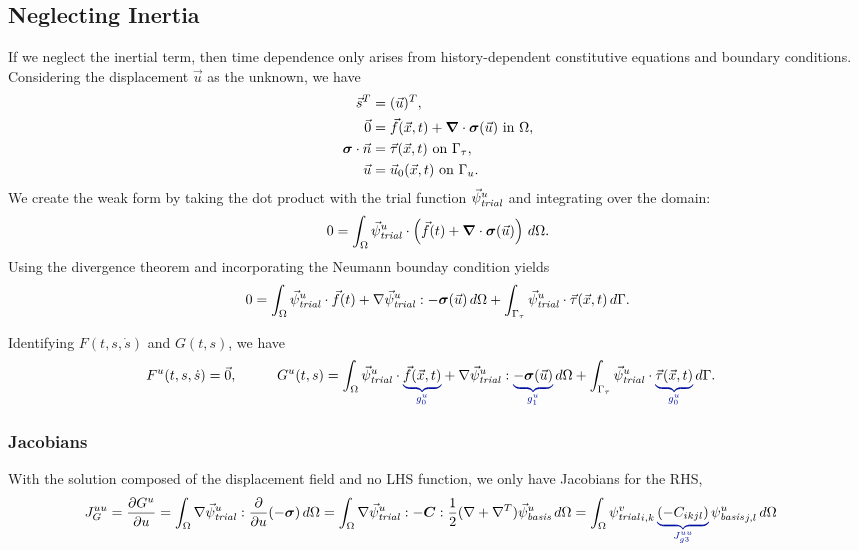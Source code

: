 \subsection{Neglecting Inertia}

If we neglect the inertial term, then time dependence only arises
from history-dependent constitutive equations and boundary
conditions. Considering the displacement $\vec{u}$ as the unknown, we
have
\begin{align}
  \vec{s}^T &= (\vec{u})^T, \\
%
  \vec{0} &= \vec{f}(\vec{x},t) + \tensor{\nabla} \cdot \tensor{\sigma}(\vec{u}) \text{ in }
\Omega, \\
  \tensor{\sigma} \cdot \vec{n} &= \vec{\tau}(\vec{x},t) \text{ on }\Gamma_\tau, \\
  \vec{u} &= \vec{u}_0(\vec{x},t) \text{ on }\Gamma_u.
\end{align}
We create the weak form by taking the dot product with the trial
function $\trialvec[u]$ and integrating over the domain:
\begin{equation}
  0 = \int_\Omega \trialvec[u] \cdot \left( \vec{f}(t) + \tensor{\nabla} \cdot \tensor{\sigma}
(\vec{u})  \right) 
\, d\Omega.
\end{equation}
Using the divergence theorem and incorporating the Neumann bounday
condition yields
\begin{equation}
  0 = \int_\Omega \trialvec[u] \cdot \vec{f}(t) + \nabla \trialvec[u] : -\tensor{\sigma}
(\vec{u}) \, d\Omega + 
\int_{\Gamma_\tau} \trialvec[u] \cdot \vec{\tau}(\vec{x},t) \, d\Gamma.
\end{equation}

Identifying $F(t,s,\dot{s})$ and $G(t,s)$, we have
\begin{alignat}{2}
  F^u(t,s,\dot{s}) &= \vec{0},
  & \qquad
  G^u(t,s) &= \int_\Omega \trialvec[u] \cdot \eqnannotate{\vec{f}(\vec{x},t)}{g_0^u} + \nabla 
\trialvec[u] : 
\eqnannotate{-\tensor{\sigma}(\vec{u})}{g_1^u} \, d\Omega + \int_{\Gamma_\tau} \trialvec[u] 
\cdot 
\eqnannotate{\vec{\tau}(\vec{x},t)}{g_0^u} \, d\Gamma.
\end{alignat}


\subsubsection{Jacobians}

With the solution composed of the displacement field and no LHS function, we only have 
Jacobians for the RHS,
\begin{align}
  J_G^{uu} &= \frac{\partial G^u}{\partial u} = \int_\Omega \nabla \trialvec[u] : 
\frac{\partial}{\partial u}(-
\tensor{\sigma}) \, d\Omega 
  = \int_\Omega \nabla \trialvec[u] : -\tensor{C} : \frac{1}{2}(\nabla + \nabla^T)\basisvec[u] 
\, d\Omega 
  = \int_\Omega \trialscalar[v]_{i,k} \, \eqnannotate{\left( -C_{ikjl} \right)}{J_{g3}^{uu}}  
\, 
\basisscalar[u]_{j,l}\, d\Omega
\end{align}

